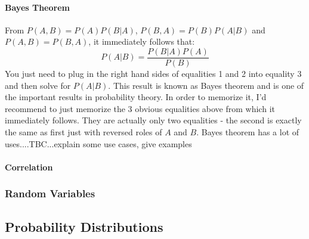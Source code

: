 \paragraph{Bayes Theorem}
From $P(A, B) = P(A) P(B|A)$,  $P(B, A) = P(B) P(A|B)$ and $P(A, B) = P(B, A)$, it immediately follows that:
\begin{equation}
\label{Eq:BayesTheorem}
 P(A|B) = \frac{P(B|A) P(A)}{P(B)}
\end{equation}
You just need to plug in the right hand sides of equalities 1 and 2 into equality 3 and then solve for $ P(A|B)$. This result is known as Bayes theorem and is one of the important results in probability theory. In order to memorize it, I'd recommend to just memorize the 3 obvious equalities above from which it immediately follows. They are actually only two equalities - the second is exactly the same as first just with reversed roles of $A$ and $B$. Bayes theorem has a lot of uses....TBC...explain some use cases, give examples







\paragraph{Correlation}


\subsubsection{Random Variables}


\subsection{Probability Distributions}


